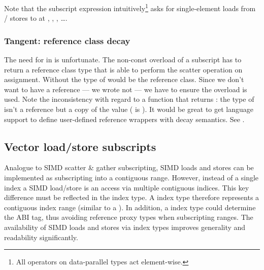Note that the  subscript expression intuitively\footnote{All
operators on data-parallel types act element-wise.} asks for
 single-element loads from / stores to  at ,
, , \ldots.

\subsubsection{Tangent: reference class decay}

The need for  in  is unfortunate. The non-const
overload of a subscript has to return a reference class type that is able to
perform the scatter operation on assignment. Without  the type
of  would be the reference class. Since we don't want to have a
reference --- we wrote  not  --- we have to ensure the
 overload is used. Note the inconsistency with regard to a function
 that returns : the type of  isn't a
reference but a copy of the value ( is ). It
would be great to get language support to define user-defined reference
wrappers with decay semantics. See \cite{PTODO}.

\subsection{Vector load/store subscripts}\label{sec:loadstore}
Analogue to SIMD scatter \& gather subscripting, SIMD loads and stores can be implemented as subscripting into a contiguous range.
However, instead of a single index a SIMD load/store is an access via multiple contiguous indices.
This key difference must be reflected in the index type.
A  index type therefore represents a contiguous index range (similar to a ).
In addition, a  index type could determine the  ABI tag, thus avoiding reference proxy types when subscripting  ranges.
The availability of SIMD loads and stores via  index types improves generality and readability significantly.

